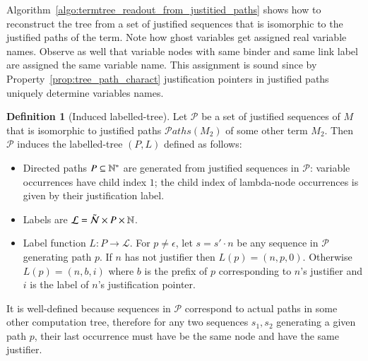 \documentclass{elsarticle}
\theoremstyle{plain}
\theoremstyle{definition}
\newtheorem{definition}{Definition}[section]
\theoremstyle{remark}
\newcommand\Nodes{\mathcal{N}}%
\newcommand\ExtendedNodes{\tilde{\Nodes}}
\newcommand\pathset{{\mathcal{P}aths}} %
\begin{document}
Algorithm~\ref{algo:termtree_readout_from_justitied_paths} shows how to reconstruct the tree from a set of justified sequences that is isomorphic to the justified paths of the term. Note how ghost variables get assigned  real variable names. Observe as well that variable nodes with same binder and same link label are assigned the same variable name. This assignment is sound since by Property~\ref{prop:tree_path_charact} justification pointers in justified paths uniquely determine variables names.

\begin{definition}[Induced labelled-tree]
Let $\mathcal{P}$ be a set of justified sequences of $M$ that is isomorphic to justified paths $\pathset(M_2)$ of some other term $M_2$.
Then $\mathcal{P}$ induces the labelled-tree $(P,L)$ defined as follows:
\begin{itemize}[nosep]
    \item Directed paths $P \subseteq \mathbb{N}^*$ are generated from justified sequences in $\mathcal{P}$: variable occurrences have child index $1$; the child index of lambda-node occurrences is given by their justification label.
    \item Labels are $\mathcal{L} = \ExtendedNodes \times P \times \nat$.
    \item Label function $L : P \rightarrow\mathcal{L}$.
    For $p\neq\epsilon$, let $s = s' \cdot n$ be any sequence in $\mathcal{P}$ generating path $p$.
    If $n$ has not justifier then $L(p) = (n, p, 0)$.
    Otherwise $L(p) = (n, b, i)$ where
    $b$ is the prefix of $p$ corresponding to $n$'s justifier and $i$ is the label of $n$'s justification pointer.
    \end{itemize}
\end{definition}
It is well-defined because sequences in $\mathcal{P}$ correspond to actual paths in some other computation tree, therefore for any two sequences $s_1, s_2$ generating a given path $p$, their last occurrence must have be the same node and have the same justifier.
\end{document}
